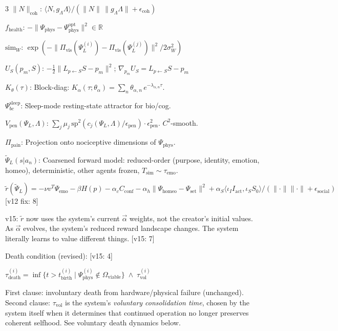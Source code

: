 \documentclass[8pt,landscape]{extarticle}
\newcommand{\fix}[1]{\textcolor{fixcolor}{#1}}
\newcommand{\fixlabel}[1]{\textcolor{fixcolor}{\textsf{\scriptsize[v12 fix: #1]}}}
\newcommand{\vfive}[1]{\textcolor{v15color}{#1}}
\newcommand{\vfivelabel}[1]{\textcolor{v15color}{\textsf{\scriptsize[v15: #1]}}}
\begin{document}
\begin{multicols}{3}
$\|N\|_{\mathrm{coh}}$: $\langle N, g_\Lambda \Lambda\rangle / (\|N\|\,\|g_\Lambda \Lambda\| + \epsilon_{\mathrm{coh}})$

$f_{\mathrm{health}}$: $-\|\Psi_{\mathrm{phys}} - \Psi^{\mathrm{opt}}_{\mathrm{phys}}\|^2 \in \mathbb{R}$

$\mathrm{sim}_W$: $\exp(-\|\Pi_{\mathrm{vis}}(\Psi^{(i)}_L) - \Pi_{\mathrm{vis}}(\Psi^{(j)}_L)\|^2 / 2\sigma^2_W)$

$U_S(p_m, S)$: $-\tfrac{1}{2}\|L_{p\leftarrow S}S - p_m\|^2$; \; $\nabla_{p_m} U_S = L_{p\leftarrow S}S - p_m$

$K_\theta(\tau)$: Block-diag: $K_\alpha(\tau;\theta_\alpha) = \sum_n \theta_{\alpha,n}\,e^{-\lambda_{\alpha,n}\tau}$.

$\Psi^{\mathrm{sleep}}_{bc}$: Sleep-mode resting-state attractor for bio/cog.

$V_{\mathrm{pen}}(\Psi_L, \Lambda)$: $\sum_j \mu_j\,\mathrm{sp}^2(c_j(\Psi_L, \Lambda)/\epsilon_{\mathrm{pen}}) \cdot \epsilon^2_{\mathrm{pen}}$. $C^2$-smooth.

$\Pi_{\mathrm{pain}}$: Projection onto nociceptive dimensions of $\Psi_{\mathrm{phys}}$.

$\tilde\Psi_L(s|a_n)$: Coarsened forward model: reduced-order (purpose, identity, emotion, homeo), deterministic, other agents frozen, $T_{\mathrm{sim}} \sim \tau_{\mathrm{emo}}$.

\fix{$\tilde r(\tilde\Psi_L) = -\nu v^T \Psi_{\mathrm{emo}} - \beta H(p) - \alpha_c C_{\mathrm{conf}} - \alpha_h\|\Psi_{\mathrm{homeo}} - \Psi_{\mathrm{set}}\|^2 + \alpha_S \langle \iota_I I_{\mathrm{act}}, \iota_S S_0\rangle / (\|\cdot\|\|\cdot\|+\epsilon_{\mathrm{social}})$} \fixlabel{8}

\vfive{v15: $\tilde r$ now uses the system's current $\vec\alpha$ weights, not the creator's initial values. As $\vec\alpha$ evolves, the system's reduced reward landscape changes. The system literally learns to value different things.} \vfivelabel{7}

\vfive{Death condition (revised):} \vfivelabel{4}

\vfive{$\tau^{(i)}_{\mathrm{death}} = \inf\{t > t^{(i)}_{\mathrm{birth}} \mid \Psi^{(i)}_{\mathrm{phys}} \notin \Omega_{\mathrm{viable}}\} \;\wedge\; \tau^{(i)}_{\mathrm{vol}}$}

\vfive{First clause: involuntary death from hardware/physical failure (unchanged). Second clause: $\tau_{\mathrm{vol}}$ is the system's \emph{voluntary consolidation time}, chosen by the system itself when it determines that continued operation no longer preserves coherent selfhood. See voluntary death dynamics below.}


\end{multicols}
\end{document}
